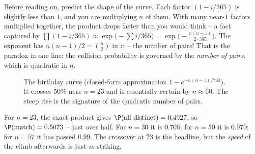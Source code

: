\begin{walkbox}
Before reading on, predict the shape of the curve. Each factor $(1 - i/365)$ is slightly
less than $1$, and you are multiplying $n$ of them. With many near-$1$ factors multiplied
together, the product drops faster than you would think -- a fact captured by
$\prod (1 - i/365) \approx \exp\!\bigl(-\sum i/365\bigr) = \exp\!\bigl(-\tfrac{n(n-1)}{2 \cdot 365}\bigr)$.
The exponent has $n(n-1)/2 = \binom{n}{2}$ in it -- the number of pairs! That is the
paradox in one line: the collision probability is governed by the \emph{number of pairs},
which is quadratic in $n$.
\end{walkbox}

\begin{figure}[H]
\centering
{}
\caption{The birthday curve (closed-form approximation $1 - e^{-n(n-1)/730}$). It crosses
$50\%$ near $n=23$ and is essentially certain by $n \approx 60$. The steep rise is the
signature of the quadratic number of pairs.}
\label{ch2:fig-birthday}
\end{figure}

\begin{example}
\label{ch2:ex-birthday-numbers}
For $n=23$, the exact product gives $\P(\text{all distinct}) = 0.4927$, so
$\P(\text{match}) = 0.5073$ -- just over half. For $n=30$ it is $0.706$; for $n=50$ it is
$0.970$; for $n=57$ it has passed $0.99$. The crossover at $23$ is the headline, but the
\emph{speed} of the climb afterwards is just as striking.
\end{example}


